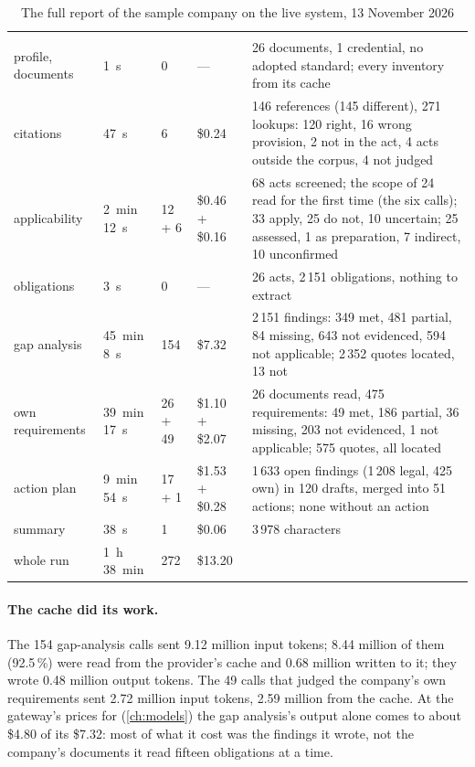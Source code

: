 \begin{xltabular}{\textwidth}{@{}L{23mm}R{18mm}R{13mm}R{23mm}Y@{}}
\caption{The full report of the sample company on the live system, 13 November
2026}\label{tab:report:run}\\
\toprule
{} &  &  &  &  \\
\midrule
\endfirsthead
\toprule
{} &  &  &  &  \\
\midrule
\endhead
\bottomrule
\endlastfoot
profile, documents & 1~s & 0 & --- & 26 documents, 1 credential, no adopted standard; every inventory from its cache \\
citations & 47~s & 6 & \$0.24 & 146 references (145 different), 271 lookups: 120 right, 16 wrong provision, 2 not in the act, 4 acts outside the corpus, 4 not judged \\
applicability & 2~min 12~s & 12 + 6 & \$0.46 + \$0.16 & 68 acts screened; the scope of 24 read for the first time (the six calls); 33 apply, 25 do not, 10 uncertain; 25 assessed, 1 as preparation, 7 indirect, 10 unconfirmed \\
obligations & 3~s & 0 & --- & 26 acts, 2\,151 obligations, nothing to extract \\
gap analysis & 45~min 8~s & 154 & \$7.32 & 2\,151 findings: 349 met, 481 partial, 84 missing, 643 not evidenced, 594 not applicable; 2\,352 quotes located, 13 not \\
own requirements & 39~min 17~s & 26 + 49 & \$1.10 + \$2.07 & 26 documents read, 475 requirements: 49 met, 186 partial, 36 missing, 203 not evidenced, 1 not applicable; 575 quotes, all located \\
action plan & 9~min 54~s & 17 + 1 & \$1.53 + \$0.28 & 1\,633 open findings (1\,208 legal, 425 own) in 120 drafts, merged into 51 actions; none without an action \\
summary & 38~s & 1 & \$0.06 & 3\,978 characters \\
\midrule
whole run & 1~h 38~min & 272 & \$13.20 & \\
\end{xltabular}

\paragraph{The cache did its work.} The 154 gap-analysis calls sent 9.12 million input tokens;
8.44 million of them (92.5\,\%) were read from the provider's cache and 0.68 million written to
it; they wrote 0.48 million output tokens. The 49 calls that judged the company's own
requirements sent 2.72 million input tokens, 2.59 million from the cache. At the gateway's
prices for  (\cref{ch:models}) the gap analysis's output alone comes to about
\$4.80 of its \$7.32: most of what it cost was the findings it wrote, not the company's documents
it read fifteen obligations at a time.

